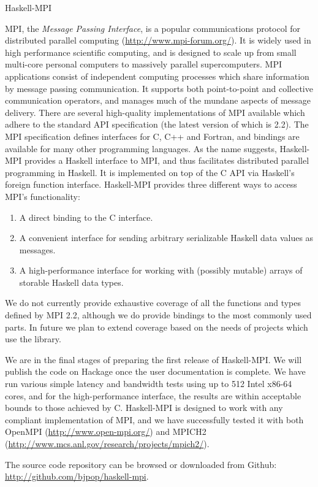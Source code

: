 \documentclass{scrreprt}
\begin{document}
\begin{hcarentry}{Haskell-MPI}
\makeheader

MPI, the \emph{Message Passing Interface}, is a popular communications protocol
for distributed parallel computing (\url{http://www.mpi-forum.org/}). It is widely
used in high performance scientific computing, and is designed to scale up from
small multi-core personal computers to massively parallel supercomputers.
MPI applications
consist of independent computing processes which share information by message passing
communication. It supports both point-to-point and collective communication operators,
and manages much of the mundane aspects of message delivery. There are several
high-quality implementations of MPI available which adhere to the standard API
specification (the latest version of which is 2.2). The MPI specification defines
interfaces for C, C++ and Fortran, and bindings are available for many other
programming languages. As the name suggests, Haskell-MPI provides a Haskell interface
to MPI, and thus facilitates distributed parallel programming in Haskell. It is implemented
on top of the C API via Haskell's foreign function interface. Haskell-MPI provides
three different ways to access MPI's functionality:
\begin{enumerate}
   \item A direct binding to the C interface.
   \item A convenient interface for sending arbitrary serializable Haskell data values as messages.
   \item A high-performance interface for working with (possibly mutable) arrays of storable
         Haskell data types.
\end{enumerate}
We do not currently provide exhaustive coverage of all the functions and types defined by MPI
2.2, although we do provide bindings to the most commonly used parts. In future we plan
to extend coverage based on the needs of projects which use the library.

We are in the final stages of preparing the first release of Haskell-MPI. We will
publish the code on Hackage once the user documentation is complete.
We have run various simple latency and bandwidth tests using up to 512 Intel x86-64 cores, and
for the high-performance interface, the results are within acceptable bounds to those
achieved by C.
Haskell-MPI is designed to work with any compliant implementation of MPI, and we
have successfully tested it with both OpenMPI (\url{http://www.open-mpi.org/}) and
MPICH2 (\url{http://www.mcs.anl.gov/research/projects/mpich2/}).

The source code repository can be browsed or downloaded from Github:
  \url{http://github.com/bjpop/haskell-mpi}.

\end{hcarentry}
\end{document}
